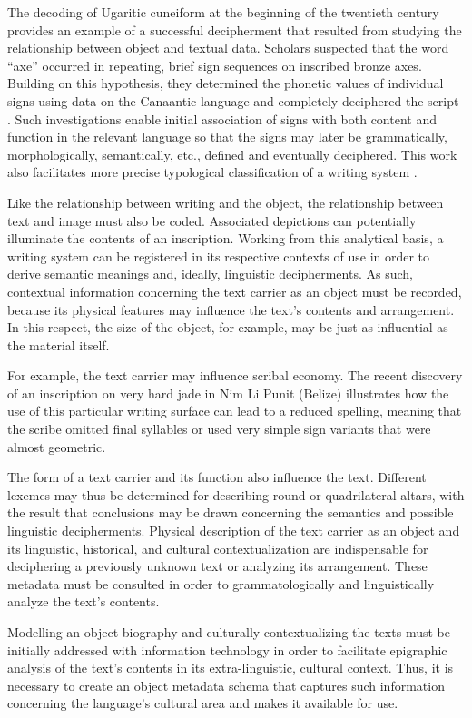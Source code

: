 \documentclass[amsthm,ebook]{saparticle}
\begin{document}
The decoding of Ugaritic cuneiform at the beginning of the twentieth century provides an example of a successful
decipherment that resulted from studying the relationship between object and textual data. Scholars suspected that the
word ``axe'' occurred in repeating, brief sign sequences on inscribed bronze axes. Building on this hypothesis, they
determined the phonetic values of individual signs using data on the Canaantic language and completely deciphered the
script \citep{Day2002}. Such investigations enable initial association of signs with both content and function in the
relevant language so that the signs may later be grammatically, morphologically, semantically, etc., defined and
eventually deciphered. This work also facilitates more precise typological classification of a writing system
\citep{Gronemeyer2015}.

Like the relationship between writing and the object, the relationship between text and image must also be coded.
Associated depictions can potentially illuminate the contents of an inscription. Working from this analytical basis, a
writing system can be registered in its respective contexts of use in order to derive semantic meanings and, ideally,
linguistic decipherments. As such, contextual information concerning the text carrier as an object must be recorded,
because its physical features may influence the text’s contents and arrangement. In this respect, the size of the
object, for example, may be just as influential as the material itself.

For example, the text carrier may influence scribal economy. The recent discovery of an inscription on very hard jade in
Nim Li Punit (Belize) illustrates how the use of this particular writing surface can lead to a reduced spelling,
meaning that the scribe omitted final syllables or used very simple sign variants that were almost geometric. 

The form of a text carrier and its function also influence the text. Different lexemes may thus be determined for
describing round or quadrilateral altars, with the result that conclusions may be drawn concerning the semantics and
possible linguistic decipherments. Physical description of the text carrier as an object and its linguistic,
historical, and cultural contextualization are indispensable for deciphering a previously unknown text or analyzing its
arrangement. These metadata must be consulted in order to grammatologically and linguistically analyze the text’s
contents. 

Modelling an object biography and culturally contextualizing the texts must be initially addressed with information
technology in order to facilitate epigraphic analysis of the text’s contents in its extra-linguistic, cultural context.
Thus, it is necessary to create an object metadata schema that captures such information concerning the language’s
cultural area and makes it available for use. 
\end{document}
